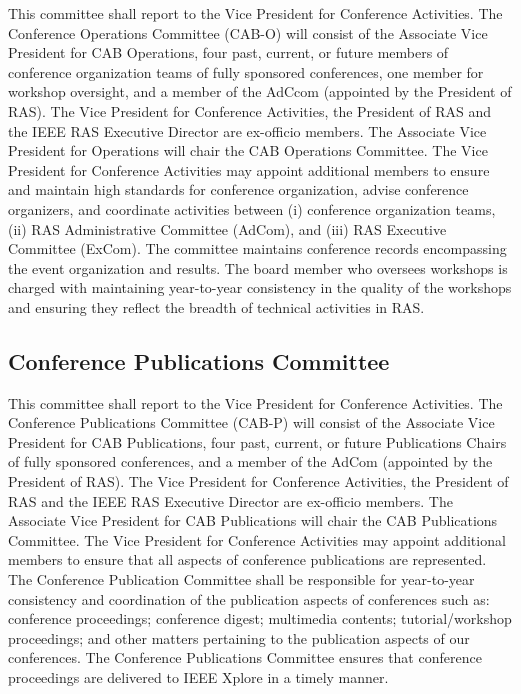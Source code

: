 \documentclass[10pt]{article}
\begin{document}
This committee shall report to the Vice President for Conference Activities. The Conference Operations Committee (CAB-O) will consist of the Associate Vice President for CAB Operations, four past, current, or future members of conference organization teams of fully sponsored conferences, one member for workshop oversight, and a member of the AdCcom (appointed by the President of RAS).  The Vice President for Conference Activities, the President of RAS and the IEEE RAS Executive Director are ex-officio members. The Associate Vice President for Operations will chair the CAB Operations Committee. The Vice President for Conference Activities may appoint additional members to ensure and maintain high standards for conference organization, advise conference organizers, and coordinate activities between (i) conference organization teams, (ii) RAS Administrative Committee (AdCom), and (iii) RAS Executive Committee (ExCom). The committee maintains conference records encompassing the event organization and results.
The board member who oversees workshops is charged with maintaining year-to-year consistency in the quality of the workshops and ensuring they reflect the breadth of technical activities in RAS.



\subsection{Conference Publications Committee}

This committee shall report to the Vice President for Conference Activities. The Conference Publications Committee (CAB-P) will consist of the Associate Vice President for CAB Publications, four past, current, or future Publications Chairs of fully sponsored conferences, and a member of the AdCom (appointed by the President of RAS). The Vice President for Conference Activities, the President of RAS and the IEEE RAS Executive Director are ex-officio members. The Associate Vice President for CAB Publications will chair the CAB Publications Committee. The Vice President for Conference Activities may appoint additional members to ensure that all aspects of conference publications are represented. The Conference Publication Committee shall be responsible for year-to-year consistency and coordination of the publication aspects of conferences such as: conference proceedings; conference digest; multimedia contents; tutorial/workshop proceedings; and other matters pertaining to the publication aspects of our conferences. The Conference Publications Committee ensures that conference proceedings are delivered to IEEE Xplore in a timely manner.
\end{document}
